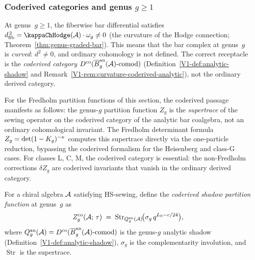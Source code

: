 \subsubsection{Coderived categories and genus $g \geq 1$}

\begin{remark}%
%
At genus~$g \geq 1$, the fiberwise bar differential satisfies
$\dfib^{\,2} = \kappaChHodge(\cA) \cdot \omega_g \neq 0$
(the curvature of the Hodge connection;
Theorem~\ref{thm:genus-graded-bar}). This means that the
bar complex at genus~$g$ is \emph{curved}: $d^2 \neq 0$,
and ordinary cohomology is not defined. The correct
receptacle is the \emph{coderived category}
$D^{\mathrm{co}}(\overline{B}^{\mathrm{an}}_g(\mathcal{A})\text{-comod})$
(Definition~\ref{V1-def:analytic-shadow} and
Remark~\ref{V1-rem:curvature-coderived-analytic}), not the
ordinary derived category.

For the Fredholm partition functions of this section, the
coderived passage manifests as follows: the genus-$g$
partition function $Z_g$ is the \emph{supertrace} of the
sewing operator on the coderived category of the analytic bar
coalgebra, not an ordinary cohomological invariant. The
Fredholm determinant formula
$Z_g = \det(1 - K_g)^{-\kappa}$ computes this
supertrace directly via the one-particle reduction, bypassing
the coderived formalism for the Heisenberg and class-G cases.
For classes L, C, M, the coderived category is essential: the
non-Fredholm corrections $\delta Z_g$ are coderived
invariants that vanish in the ordinary derived category.
\end{remark}

\begin{definition}%
%
For a chiral algebra $\mathcal{A}$ satisfying HS-sewing, define the
\emph{coderived shadow partition function} at genus~$g$ as
\begin{equation}%
Z_g^{\mathrm{co}}(\cA;\,\tau)
\;=\;
\operatorname{Str}_{Q_g^{\mathrm{an}}(\cA)}
\!\bigl(\sigma_g\,q^{L_0 - c/24}\bigr),
\end{equation}
where $Q_g^{\mathrm{an}}(\mathcal{A})
= D^{\mathrm{co}}(\overline{B}^{\mathrm{an}}_g(\mathcal{A})\text{-comod})$ is the
genus-$g$ analytic shadow
\textup{(}Definition~\textup{\ref{V1-def:analytic-shadow}}\textup{)},
$\sigma_g$ is the complementarity involution, and
$\operatorname{Str}$ is the supertrace.
\end{definition}

